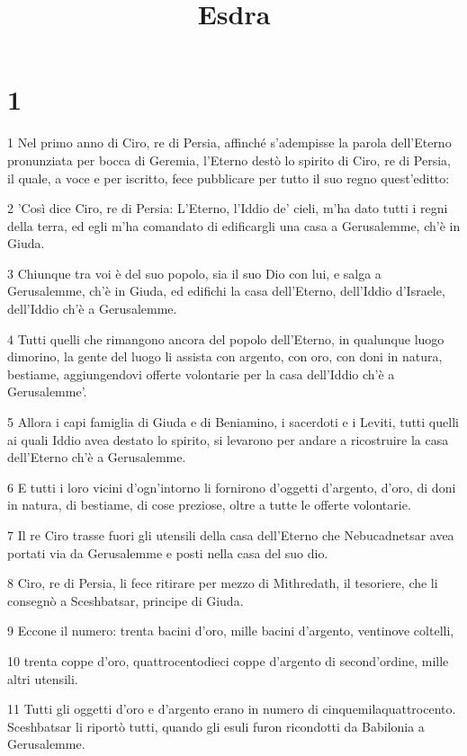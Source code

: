 

\title{Esdra}


\chapter{1}

\par 1 Nel primo anno di Ciro, re di Persia, affinché s'adempisse la parola dell'Eterno pronunziata per bocca di Geremia, l'Eterno destò lo spirito di Ciro, re di Persia, il quale, a voce e per iscritto, fece pubblicare per tutto il suo regno quest'editto:
\par 2 'Così dice Ciro, re di Persia: L'Eterno, l'Iddio de' cieli, m'ha dato tutti i regni della terra, ed egli m'ha comandato di edificargli una casa a Gerusalemme, ch'è in Giuda.
\par 3 Chiunque tra voi è del suo popolo, sia il suo Dio con lui, e salga a Gerusalemme, ch'è in Giuda, ed edifichi la casa dell'Eterno, dell'Iddio d'Israele, dell'Iddio ch'è a Gerusalemme.
\par 4 Tutti quelli che rimangono ancora del popolo dell'Eterno, in qualunque luogo dimorino, la gente del luogo li assista con argento, con oro, con doni in natura, bestiame, aggiungendovi offerte volontarie per la casa dell'Iddio ch'è a Gerusalemme'.
\par 5 Allora i capi famiglia di Giuda e di Beniamino, i sacerdoti e i Leviti, tutti quelli ai quali Iddio avea destato lo spirito, si levarono per andare a ricostruire la casa dell'Eterno ch'è a Gerusalemme.
\par 6 E tutti i loro vicini d'ogn'intorno li fornirono d'oggetti d'argento, d'oro, di doni in natura, di bestiame, di cose preziose, oltre a tutte le offerte volontarie.
\par 7 Il re Ciro trasse fuori gli utensili della casa dell'Eterno che Nebucadnetsar avea portati via da Gerusalemme e posti nella casa del suo dio.
\par 8 Ciro, re di Persia, li fece ritirare per mezzo di Mithredath, il tesoriere, che li consegnò a Sceshbatsar, principe di Giuda.
\par 9 Eccone il numero: trenta bacini d'oro, mille bacini d'argento, ventinove coltelli,
\par 10 trenta coppe d'oro, quattrocentodieci coppe d'argento di second'ordine, mille altri utensili.
\par 11 Tutti gli oggetti d'oro e d'argento erano in numero di cinquemilaquattrocento. Sceshbatsar li riportò tutti, quando gli esuli furon ricondotti da Babilonia a Gerusalemme.

